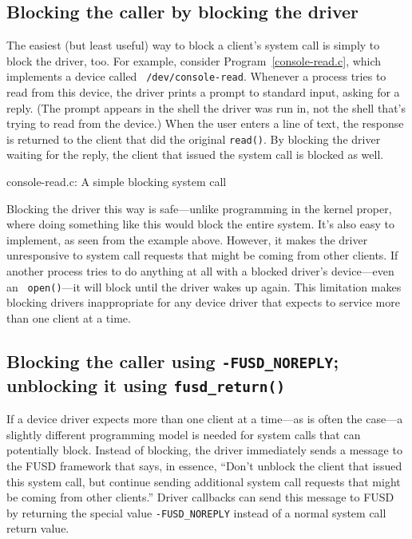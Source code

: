 \documentclass{article}
\begin{document}
\subsection{Blocking the caller by blocking the driver}

The easiest (but least useful) way to block a client's system call is
simply to block the driver, too.  For example, consider
Program~\ref{console-read.c}, which implements a device called {\tt
/dev/console-read}.  Whenever a process tries to read from this
device, the driver prints a prompt to standard input, asking for a
reply.  (The prompt appears in the shell the driver was run in, not
the shell that's trying to read from the device.)  When the user
enters a line of text, the response is returned to the client that did
the original {\tt read()}.  By blocking the driver waiting for the
reply, the client that issued the system call is blocked as well.

\begin{Program}
\caption{console-read.c: A simple blocking system call}
\label{console-read.c}
\end{Program}

Blocking the driver this way is safe---unlike programming in the
kernel proper, where doing something like this would block the entire
system.  It's also easy to implement, as seen from the example above.
However, it makes the driver unresponsive to system call requests that
might be coming from other clients.  If another process tries to do
anything at all with a blocked driver's device---even an {\tt
open()}---it will block until the driver wakes up again.  This
limitation makes blocking drivers inappropriate for any device driver
that expects to service more than one client at a time.


\subsection{Blocking the caller using {\tt -FUSD\_NOREPLY};
unblocking it using {\tt fusd\_return()}}
\label{fusd-noreply}

If a device driver expects more than one client at a time---as is
often the case---a slightly different programming model is needed for
system calls that can potentially block.  Instead of blocking, the
driver immediately sends a message to the FUSD framework that says, in
essence, ``Don't unblock the client that issued this system call, but
continue sending additional system call requests that might be coming
from other clients.''  Driver callbacks can send this message to FUSD
by returning the special value {\tt -FUSD\_NOREPLY} instead of a
normal system call return value.
\end{document}
